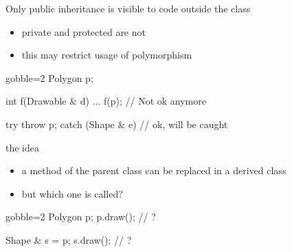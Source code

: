 \begin{frame}[fragile]
  \begin{block}{Only public inheritance is visible to code outside the class}
    \begin{itemize}
    \item private and protected are not
    \item this may restrict usage of polymorphism
    \end{itemize}
  \end{block}
  \begin{multicols}{2}
    \begin{cppcode*}{gobble=2}
      Polygon p;

      int f(Drawable & d) {...}
      f(p);  // Not ok anymore

      try {
        throw p;
      } catch (Shape & e) {
        // ok, will be caught
      }
    \end{cppcode*}
    \columnbreak
    \center
  \end{multicols}
\end{frame}

\begin{frame}[fragile]
  \begin{block}{the idea}
    \begin{itemize}
    \item a method of the parent class can be replaced in a derived class
    \item but which one is called?
    \end{itemize}
  \end{block}
  \begin{multicols}{2}
    \begin{cppcode*}{gobble=2}
      Polygon p;
      p.draw(); // ?

      Shape & s = p;
      s.draw(); // ?
    \end{cppcode*}
    \columnbreak
    \center
  \end{multicols}
\end{frame}

